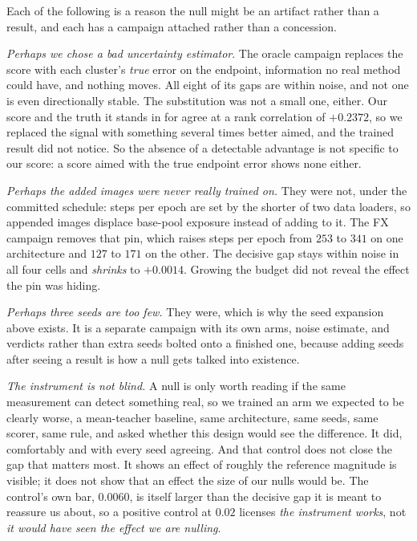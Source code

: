 \documentclass{article}
\begin{document}
Each of the following is a reason the null might be an artifact rather than a result, and each has a campaign attached rather than a concession.

\emph{Perhaps we chose a bad uncertainty estimator}. The oracle campaign replaces the score with each cluster's \emph{true} error on the endpoint, information no real method could have, and nothing moves. All eight of its gaps are within noise, and not one is even directionally stable.
The substitution was not a small one, either. Our score and the truth it stands in for agree at a
rank correlation of $+0.2372$, so we replaced the signal with something several times better aimed, and the trained result did not notice. So the absence of a detectable advantage is not specific to our score: a score aimed with the true endpoint error shows none either.

\emph{Perhaps the added images were never really trained on.} They were not, under the committed
schedule: steps per epoch are set by the shorter of two data loaders, so appended images displace
base-pool exposure instead of adding to it. The FX campaign removes that pin, which raises steps per
epoch from $253$ to $341$ on one architecture and $127$ to $171$ on the other. The decisive gap
stays within noise in all four cells and \emph{shrinks} to $+0.0014$. Growing the budget did not
reveal the effect the pin was hiding.

\emph{Perhaps three seeds are too few.} They were, which is why the seed expansion above exists.
It is a separate campaign with its own arms, noise estimate, and verdicts rather than extra seeds
bolted onto a finished one, because adding seeds after seeing a result is how a null gets talked
into existence.

\emph{The instrument is not blind.} A null is only worth reading if the same measurement can
detect something real, so we trained an arm we expected to be clearly worse, a mean-teacher
baseline, same architecture, same seeds, same scorer, same rule, and asked whether this design
would see the difference. It did, comfortably and with every seed agreeing. And that control does not close the gap that matters most. It shows an effect of roughly the reference magnitude is visible; it does not show that an effect the size of our nulls would be.
The control's own bar, $0.0060$, is itself larger than the decisive gap it is meant to reassure us
about, so a positive control at $0.02$ licenses \emph{the instrument works}, not \emph{it would have
seen the effect we are nulling}.
\end{document}
